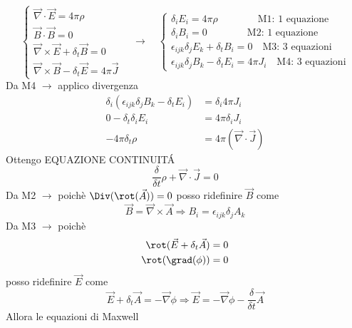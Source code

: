 \begin{equation*}
    \begin{cases}
        \vec{\nabla} \cdot \vec{E} = 4\pi\rho \\
        \vec{B} \cdot \vec{B} = 0 \\
        \vec{\nabla} \times \vec{E} + \delta_t \vec{B} = 0 \\
        \vec{\nabla} \times \vec{B} - \delta_t \vec{E} = 4 \pi \vec{J}
    \end{cases} \quad \rightarrow \quad 
    \begin{cases}
        \delta_iE_i = 4\pi \rho  \qquad \qquad \text{M1: 1 equazione}\\
        \delta_iB_i = 0  \qquad \qquad \text{M2: 1 equazione}\\
        \epsilon_{ijk} \delta_jE_k + \delta_t B_i = 0 \quad \text{M3: 3 equazioni}\\
        \epsilon_{ijk} \delta_jB_k - \delta_t E_i = 4 \pi J_i \quad \text{M4: 3 equazioni}
    \end{cases}
\end{equation*}
Da M4 $\rightarrow$ applico divergenza
\begin{align*}
    \delta_i (\epsilon_{ijk} \delta_jB_k - \delta_t E_i) &= \delta_i 4 \pi J_i \\
    0 - \delta_t\delta_iE_i &= 4\pi \delta_iJ_i \\
    - 4\pi \delta_t\rho &= 4\pi (\vec{\nabla}\cdot \vec{J}) 
\end{align*}
Ottengo EQUAZIONE CONTINUIT\'A 
\begin{equation*}
    \frac{\delta}{\delta t}\rho + \vec{\nabla} \cdot \vec{J} = 0
\end{equation*}
Da M2 $\rightarrow$ poichè $\Div(\rot(\vec{A})) = 0$ posso ridefinire $\vec{B}$ come
\begin{equation*}
    \vec{B} = \vec{\nabla} \times \vec{A} \Rightarrow B_i = \epsilon_{ijk} \delta_j A_k
\end{equation*}
Da M3 $\rightarrow$ poichè
\begin{eqnarray*}
    \rot(\vec{E} + \delta_t \vec{A}) = 0 \\
    \rot(\grad(\phi)) = 0
\end{eqnarray*}
posso ridefinire $\vec{E}$ come
\begin{equation*}
    \vec{E} + \delta_t \vec{A} = -\vec{\nabla}\phi \Rightarrow \vec{E} = - \vec{\nabla} \phi - \frac{\delta}{\delta t} \vec{A}
\end{equation*}
Allora le equazioni di Maxwell

